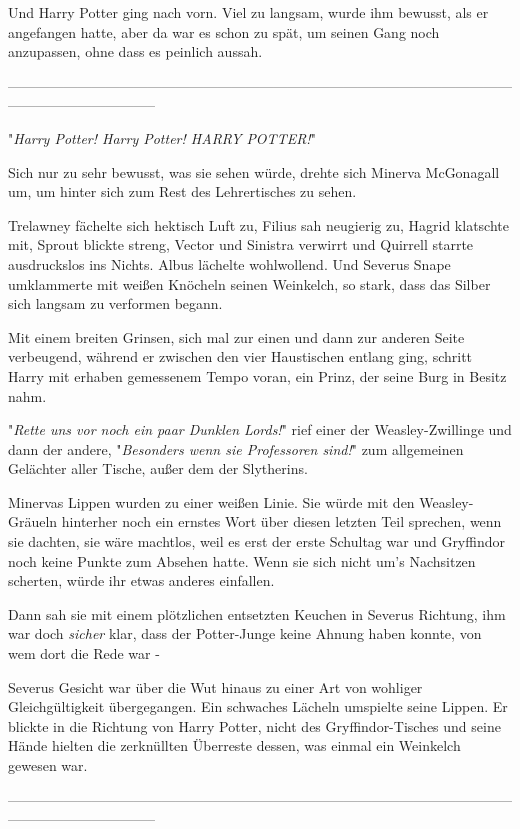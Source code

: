 {Und Harry Potter ging nach vorn. Viel zu langsam, wurde ihm bewusst, als er angefangen hatte, aber da war es schon zu spät, um seinen Gang noch anzupassen, ohne dass es peinlich aussah.

--------------------------------------------------------------------------------------------------------------------------------------------

"\emph{Harry Potter! Harry Potter! HARRY POTTER!}"

Sich nur zu sehr bewusst, was sie sehen würde, drehte sich Minerva McGonagall um, um hinter sich zum Rest des Lehrertisches zu sehen.

Trelawney fächelte sich hektisch Luft zu, Filius sah neugierig zu, Hagrid klatschte mit, Sprout blickte streng, Vector und Sinistra verwirrt und Quirrell starrte ausdruckslos ins Nichts. Albus lächelte wohlwollend. Und Severus Snape umklammerte mit weißen Knöcheln seinen Weinkelch, so stark, dass das Silber sich langsam zu verformen begann.

Mit einem breiten Grinsen, sich mal zur einen und dann zur anderen Seite verbeugend, während er zwischen den vier Haustischen entlang ging, schritt Harry mit erhaben gemessenem Tempo voran, ein Prinz, der seine Burg in Besitz nahm.

"\emph{Rette uns vor noch ein paar Dunklen Lords!}" rief einer der Weasley-Zwillinge und dann der andere, "\emph{Besonders wenn sie Professoren sind!}" zum allgemeinen Gelächter aller Tische, außer dem der Slytherins.

Minervas Lippen wurden zu einer weißen Linie. Sie würde mit den Weasley-Gräueln hinterher noch ein ernstes Wort über diesen letzten Teil sprechen, wenn sie dachten, sie wäre machtlos, weil es erst der erste Schultag war und Gryffindor noch keine Punkte zum Absehen hatte. Wenn sie sich nicht um's Nachsitzen scherten, würde ihr etwas anderes einfallen.

Dann sah sie mit einem plötzlichen entsetzten Keuchen in Severus Richtung, ihm war doch \emph{sicher} klar, dass der Potter-Junge keine Ahnung haben konnte, von wem dort die Rede war -

Severus Gesicht war über die Wut hinaus zu einer Art von wohliger Gleichgültigkeit übergegangen. Ein schwaches Lächeln umspielte seine Lippen. Er blickte in die Richtung von Harry Potter, nicht des Gryffindor-Tisches und seine Hände hielten die zerknüllten Überreste dessen, was einmal ein Weinkelch gewesen war.

--------------------------------------------------------------------------------------------------------------------------------------------

}
